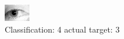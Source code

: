 \begin{figure}[h!]
\begin{center}
\includegraphics[width=0.60\columnwidth]{figures/ID1259_class_4_target_3.png}
\end{center}
\caption{ Classification: 4 actual target: 3}
\label{fig:ID1259_class_4_target_3}
\end{figure}
